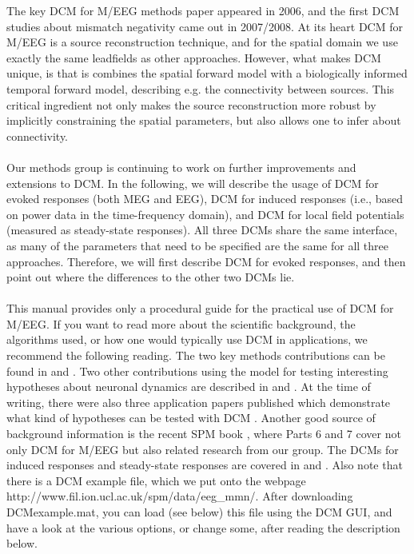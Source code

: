 The key DCM for M/EEG methods paper appeared in 2006, and the
first DCM studies about mismatch negativity came out
in 2007/2008. At its heart DCM for M/EEG is a source reconstruction technique, and for
the spatial domain we use exactly the same leadfields as other
approaches. However, what makes DCM unique, is that is combines the
spatial forward model with a biologically informed temporal forward model, describing e.g. the
connectivity between sources. This critical ingredient not only makes
the source reconstruction more robust by implicitly constraining the
spatial parameters, but also allows one to infer about connectivity.
\\
\\
Our methods group is continuing to work on further
improvements and extensions to DCM. In the following, we will describe the usage of DCM for evoked
responses (both MEG and EEG), DCM for induced responses (i.e., based
on power data in the time-frequency domain), and DCM for local field
potentials (measured as steady-state responses). All three DCMs share the
same interface, as many of the parameters that need to be specified are the same for all three approaches. Therefore, we will first
describe DCM for evoked responses, and then point out where the differences to the other two DCMs lie.
\\
\\
This manual provides only a procedural guide for the practical use of DCM for
M/EEG. If you want to read more about the scientific background, the
algorithms used, or how one would typically use DCM in applications,
we recommend the following reading. The two key methods
contributions can be found in \cite{od_dcm_erp} and
\cite{sjk_dcm_erp}. Two other contributions using the model for
testing interesting hypotheses about neuronal dynamics are described
in \cite{sjk_dcm_intrinsic} and \cite{matthias_dcm_constraints}. At
the time of writing, there were also three application papers published which demonstrate
what kind of hypotheses can be tested with DCM
\cite{mg_dcm_repro,mg_feedback,marta_mmndcm}. Another good source of
background information is the recent SPM book
\cite{spm_book}, where Parts 6 and 7 cover not only DCM for M/EEG but
also related research from our group. The DCMs for induced responses
and steady-state responses are covered in \cite{cc_induced, cc_asymm} and
\cite{dcm_ssr,rm_spectralnmm,rm_massmodelspectral}. Also note that there is a DCM example file, which we put onto the webpage http://www.fil.ion.ucl.ac.uk/spm/data/eeg\_mmn/. After downloading DCMexample.mat, you can load (see below) this file using the DCM GUI, and have a look at the various options, or change some, after reading the description below.

